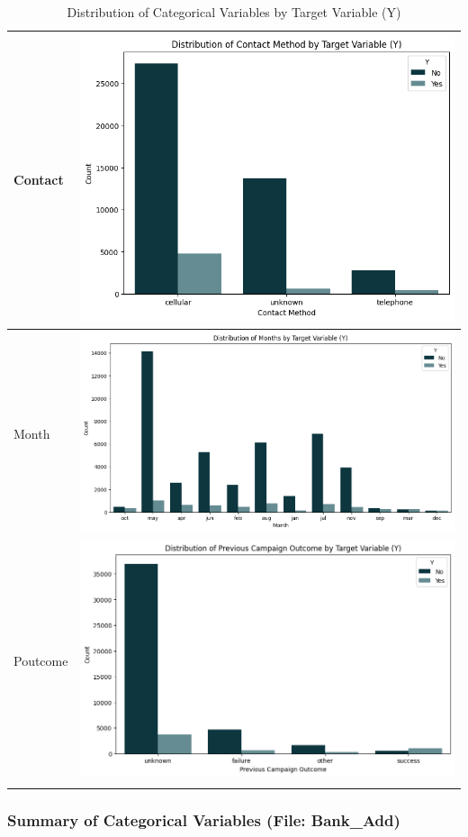 \documentclass{article}
\begin{document}
\begin{longtable}{|l|c|}
               Contact & \includegraphics[width=0.7\linewidth]{data/bank_marketing/pic/Bank_Contact.png} \\ \hline
               Month & \includegraphics[width=0.7\linewidth]{data/bank_marketing/pic/Bank_Month.png} \\ \hline 
               Poutcome & \includegraphics[width=0.7\linewidth]{data/bank_marketing/pic/Bank_Pout.png} \\ \hline
               \hline
               \caption{Distribution of Categorical Variables by Target Variable (Y)}
               \label{tab:attribute_distribution}
           \end{longtable}
           

           \subsubsection{Summary of Categorical Variables (File: Bank\_Add)}
\end{document}
